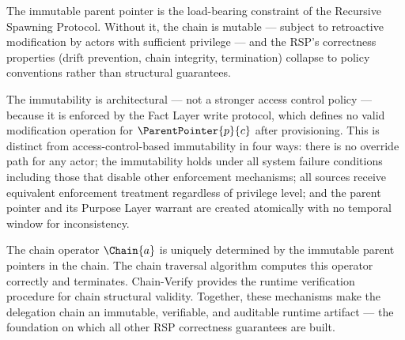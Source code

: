 The immutable parent pointer is the load-bearing constraint of the Recursive Spawning Protocol. Without it, the chain is mutable --- subject to retroactive modification by actors with sufficient privilege --- and the RSP's correctness properties (drift prevention, chain integrity, termination) collapse to policy conventions rather than structural guarantees.

The immutability is architectural --- not a stronger access control policy --- because it is enforced by the Fact Layer write protocol, which defines no valid modification operation for $\ParentPointer{p}{c}$ after provisioning. This is distinct from access-control-based immutability in four ways: there is no override path for any actor; the immutability holds under all system failure conditions including those that disable other enforcement mechanisms; all sources receive equivalent enforcement treatment regardless of privilege level; and the parent pointer and its Purpose Layer warrant are created atomically with no temporal window for inconsistency.

The chain operator $\Chain{a}$ is uniquely determined by the immutable parent pointers in the chain. The chain traversal algorithm computes this operator correctly and terminates. Chain-Verify provides the runtime verification procedure for chain structural validity. Together, these mechanisms make the delegation chain an immutable, verifiable, and auditable runtime artifact --- the foundation on which all other RSP correctness guarantees are built.